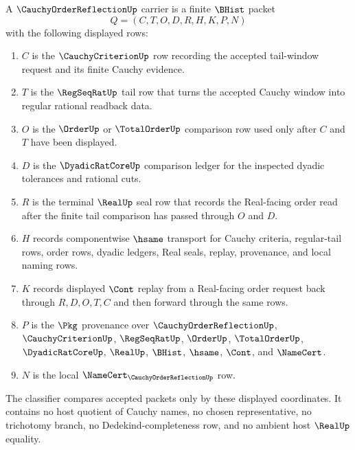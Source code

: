 \begin{definition}
\label{def:cauchy-order-reflection-carrier}
A $\CauchyOrderReflectionUp$ carrier is a finite $\BHist$ packet
$$
Q=(C,T,O,D,R,H,K,P,N)
$$
with the following displayed rows:
\begin{enumerate}
\item $C$ is the $\CauchyCriterionUp$ row recording the accepted tail-window request and its finite Cauchy evidence.
\item $T$ is the $\RegSeqRatUp$ tail row that turns the accepted Cauchy window into regular rational readback data.
\item $O$ is the $\OrderUp$ or $\TotalOrderUp$ comparison row used only after $C$ and $T$ have been displayed.
\item $D$ is the $\DyadicRatCoreUp$ comparison ledger for the inspected dyadic tolerances and rational cuts.
\item $R$ is the terminal $\RealUp$ seal row that records the Real-facing order read after the finite tail comparison has passed through $O$ and $D$.
\item $H$ records componentwise $\hsame$ transport for Cauchy criteria, regular-tail rows, order rows, dyadic ledgers, Real seals, replay, provenance, and local naming rows.
\item $K$ records displayed $\Cont$ replay from a Real-facing order request back through $R,D,O,T,C$ and then forward through the same rows.
\item $P$ is the $\Pkg$ provenance over $\CauchyOrderReflectionUp$, $\CauchyCriterionUp$, $\RegSeqRatUp$, $\OrderUp$, $\TotalOrderUp$, $\DyadicRatCoreUp$, $\RealUp$, $\BHist$, $\hsame$, $\Cont$, and $\NameCert$.
\item $N$ is the local $\NameCert_{\CauchyOrderReflectionUp}$ row.
\end{enumerate}
The classifier compares accepted packets only by these displayed coordinates. It contains no host quotient of Cauchy names, no chosen representative, no trichotomy branch, no Dedekind-completeness row, and no ambient host $\RealUp$ equality.
\end{definition}


